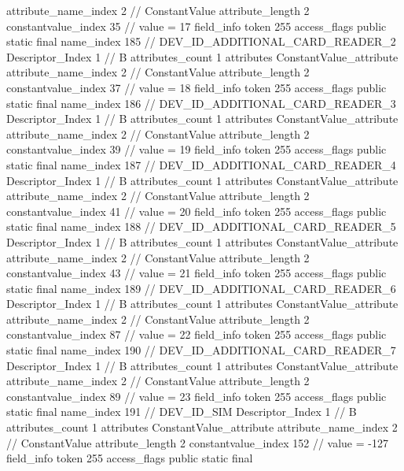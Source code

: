 {{{{{{{					attribute_name_index	2		// ConstantValue
					attribute_length	2
					constantvalue_index	35		// value = 17
				}
				}
			}
			field_info {
				token	255
				access_flags	public static final
				name_index	185		// DEV_ID_ADDITIONAL_CARD_READER_2
				Descriptor_Index	1		// B
				attributes_count	1
				attributes {
				ConstantValue_attribute {
					attribute_name_index	2		// ConstantValue
					attribute_length	2
					constantvalue_index	37		// value = 18
				}
				}
			}
			field_info {
				token	255
				access_flags	public static final
				name_index	186		// DEV_ID_ADDITIONAL_CARD_READER_3
				Descriptor_Index	1		// B
				attributes_count	1
				attributes {
				ConstantValue_attribute {
					attribute_name_index	2		// ConstantValue
					attribute_length	2
					constantvalue_index	39		// value = 19
				}
				}
			}
			field_info {
				token	255
				access_flags	public static final
				name_index	187		// DEV_ID_ADDITIONAL_CARD_READER_4
				Descriptor_Index	1		// B
				attributes_count	1
				attributes {
				ConstantValue_attribute {
					attribute_name_index	2		// ConstantValue
					attribute_length	2
					constantvalue_index	41		// value = 20
				}
				}
			}
			field_info {
				token	255
				access_flags	public static final
				name_index	188		// DEV_ID_ADDITIONAL_CARD_READER_5
				Descriptor_Index	1		// B
				attributes_count	1
				attributes {
				ConstantValue_attribute {
					attribute_name_index	2		// ConstantValue
					attribute_length	2
					constantvalue_index	43		// value = 21
				}
				}
			}
			field_info {
				token	255
				access_flags	public static final
				name_index	189		// DEV_ID_ADDITIONAL_CARD_READER_6
				Descriptor_Index	1		// B
				attributes_count	1
				attributes {
				ConstantValue_attribute {
					attribute_name_index	2		// ConstantValue
					attribute_length	2
					constantvalue_index	87		// value = 22
				}
				}
			}
			field_info {
				token	255
				access_flags	public static final
				name_index	190		// DEV_ID_ADDITIONAL_CARD_READER_7
				Descriptor_Index	1		// B
				attributes_count	1
				attributes {
				ConstantValue_attribute {
					attribute_name_index	2		// ConstantValue
					attribute_length	2
					constantvalue_index	89		// value = 23
				}
				}
			}
			field_info {
				token	255
				access_flags	public static final
				name_index	191		// DEV_ID_SIM
				Descriptor_Index	1		// B
				attributes_count	1
				attributes {
				ConstantValue_attribute {
					attribute_name_index	2		// ConstantValue
					attribute_length	2
					constantvalue_index	152		// value = -127
				}
				}
			}
			field_info {
				token	255
				access_flags	public static final
}}}}}
